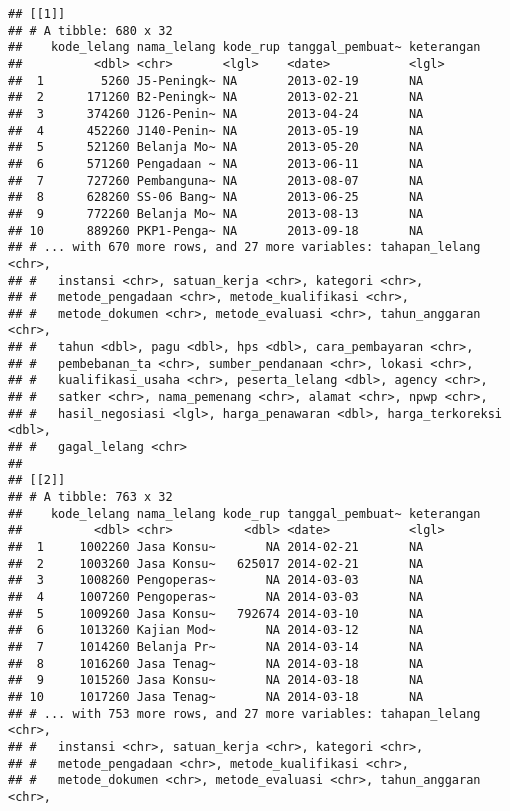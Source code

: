 \documentclass[]{article}
\begin{document}
\begin{verbatim}
## [[1]]
## # A tibble: 680 x 32
##    kode_lelang nama_lelang kode_rup tanggal_pembuat~ keterangan
##          <dbl> <chr>       <lgl>    <date>           <lgl>     
##  1        5260 J5-Peningk~ NA       2013-02-19       NA        
##  2      171260 B2-Peningk~ NA       2013-02-21       NA        
##  3      374260 J126-Penin~ NA       2013-04-24       NA        
##  4      452260 J140-Penin~ NA       2013-05-19       NA        
##  5      521260 Belanja Mo~ NA       2013-05-20       NA        
##  6      571260 Pengadaan ~ NA       2013-06-11       NA        
##  7      727260 Pembanguna~ NA       2013-08-07       NA        
##  8      628260 SS-06 Bang~ NA       2013-06-25       NA        
##  9      772260 Belanja Mo~ NA       2013-08-13       NA        
## 10      889260 PKP1-Penga~ NA       2013-09-18       NA        
## # ... with 670 more rows, and 27 more variables: tahapan_lelang <chr>,
## #   instansi <chr>, satuan_kerja <chr>, kategori <chr>,
## #   metode_pengadaan <chr>, metode_kualifikasi <chr>,
## #   metode_dokumen <chr>, metode_evaluasi <chr>, tahun_anggaran <chr>,
## #   tahun <dbl>, pagu <dbl>, hps <dbl>, cara_pembayaran <chr>,
## #   pembebanan_ta <chr>, sumber_pendanaan <chr>, lokasi <chr>,
## #   kualifikasi_usaha <chr>, peserta_lelang <dbl>, agency <chr>,
## #   satker <chr>, nama_pemenang <chr>, alamat <chr>, npwp <chr>,
## #   hasil_negosiasi <lgl>, harga_penawaran <dbl>, harga_terkoreksi <dbl>,
## #   gagal_lelang <chr>
## 
## [[2]]
## # A tibble: 763 x 32
##    kode_lelang nama_lelang kode_rup tanggal_pembuat~ keterangan
##          <dbl> <chr>          <dbl> <date>           <lgl>     
##  1     1002260 Jasa Konsu~       NA 2014-02-21       NA        
##  2     1003260 Jasa Konsu~   625017 2014-02-21       NA        
##  3     1008260 Pengoperas~       NA 2014-03-03       NA        
##  4     1007260 Pengoperas~       NA 2014-03-03       NA        
##  5     1009260 Jasa Konsu~   792674 2014-03-10       NA        
##  6     1013260 Kajian Mod~       NA 2014-03-12       NA        
##  7     1014260 Belanja Pr~       NA 2014-03-14       NA        
##  8     1016260 Jasa Tenag~       NA 2014-03-18       NA        
##  9     1015260 Jasa Konsu~       NA 2014-03-18       NA        
## 10     1017260 Jasa Tenag~       NA 2014-03-18       NA        
## # ... with 753 more rows, and 27 more variables: tahapan_lelang <chr>,
## #   instansi <chr>, satuan_kerja <chr>, kategori <chr>,
## #   metode_pengadaan <chr>, metode_kualifikasi <chr>,
## #   metode_dokumen <chr>, metode_evaluasi <chr>, tahun_anggaran <chr>,

\end{verbatim}
\end{document}
